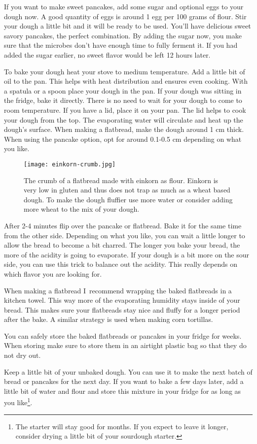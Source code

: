 If you want to make sweet pancakes, add some sugar and optional eggs to your dough
now. A good quantity of eggs is around 1 egg per 100 grams of flour.
Stir your dough a little bit and it will be ready to be used. You'll
have delicious sweet savory pancakes, the perfect combination. By
adding the sugar now, you make sure that the microbes don't have
enough time to fully ferment it. If you had added the sugar
earlier, no sweet flavor would be left 12 hours later.

To bake your dough heat your stove to medium temperature. Add a little bit of
oil to the pan. This helps with heat distribution and ensures even cooking.
With a spatula or a spoon place your dough in the pan. If your dough
was sitting in the fridge, bake it directly. There is no need to wait for your
dough to come to room temperature. If you have a lid,
place it on your pan. The lid helps to cook your dough from the top.
The evaporating water will circulate and heat up the dough's surface. When
making a flatbread, make the dough around 1 cm thick. When using the pancake
option, opt for around 0.1-0.5 cm depending on what you like.

\begin{figure}[htb!]
  \texttt{[image: einkorn-crumb.jpg]}
  \centering
  \caption{The crumb of a flatbread made with einkorn as flour. Einkorn
  is very low in gluten and thus does not trap as much  as a wheat based
  dough. To make the dough fluffier use more water or consider adding
  more wheat to the mix of your dough.}
\end{figure}

After 2-4 minutes flip over the pancake or flatbread. Bake it for the same
time from the other side. Depending on what you like, you can wait a little
longer to allow the bread to become a bit charred. The longer you
bake your bread, the more of the acidity is going to evaporate. If your
dough is a bit more on the sour side, you can use this trick to balance
out the acidity. This really depends on which flavor you are looking for.

When making a flatbread I~recommend wrapping the baked flatbreads
in a kitchen towel. This way more of the evaporating humidity
stays inside of your bread. This makes sure your flatbreads stay
nice and fluffy for a longer period after the bake. A similar strategy is
used when making corn tortillas.

You can safely store the baked flatbreads or pancakes in your fridge
for weeks. When storing make sure to store them in an airtight plastic bag so that
they do not dry out.

Keep a little bit of your unbaked dough. You can use it to make the next
batch of bread or pancakes for the next day. If you want to bake a few days later, add
a little bit of water and flour and store this mixture in your fridge
for as long as you like\footnote{The starter will stay good for months. If you expect to
leave it longer, consider drying a little bit of your sourdough starter.}.
